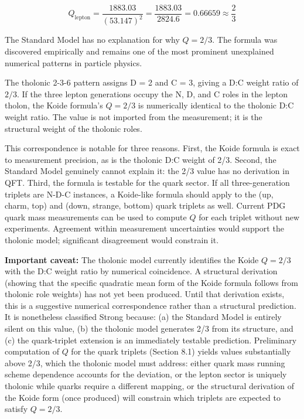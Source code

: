 \documentclass[12pt]{article}
\begin{document}
\[Q_\text{lepton} = \frac{1883.03}{(53.147)^2} = \frac{1883.03}{2824.6} = 0.66659 \approx \frac{2}{3}\]

The Standard Model has no explanation for why \(Q = 2/3\). The formula
was discovered empirically and remains one of the most prominent
unexplained numerical patterns in particle physics.

The tholonic 2-3-6 pattern assigns D = 2 and C = 3, giving a D:C weight
ratio of \(2/3\). If the three lepton generations occupy the N, D, and C
roles in the lepton tholon, the Koide formula's \(Q = 2/3\) is
numerically identical to the tholonic D:C weight ratio. The value is not
imported from the measurement; it is the structural weight of the
tholonic roles.

This correspondence is notable for three reasons. First, the Koide
formula is exact to measurement precision, as is the tholonic D:C weight
of 2/3. Second, the Standard Model genuinely cannot explain it: the 2/3
value has no derivation in QFT. Third, the formula is testable for the
quark sector. If all three-generation triplets are N-D-C instances, a
Koide-like formula should apply to the (up, charm, top) and (down,
strange, bottom) quark triplets as well. Current PDG quark mass
measurements can be used to compute \(Q\) for each triplet without new
experiments. Agreement within measurement uncertainties would support
the tholonic model; significant disagreement would constrain it.

\textbf{Important caveat:} The tholonic model currently identifies the
Koide \(Q = 2/3\) with the D:C weight ratio by numerical coincidence. A
structural derivation (showing that the specific quadratic mean form of
the Koide formula follows from tholonic role weights) has not yet been
produced. Until that derivation exists, this is a suggestive numerical
correspondence rather than a structural prediction. It is nonetheless
classified Strong because: (a) the Standard Model is entirely silent on
this value, (b) the tholonic model generates 2/3 from its structure, and
(c) the quark-triplet extension is an immediately testable prediction.
Preliminary computation of \(Q\) for the quark triplets (Section 8.1)
yields values substantially above 2/3, which the tholonic model must
address: either quark mass running scheme dependence accounts for the
deviation, or the lepton sector is uniquely tholonic while quarks
require a different mapping, or the structural derivation of the Koide
form (once produced) will constrain which triplets are expected to
satisfy \(Q = 2/3\).
\end{document}
